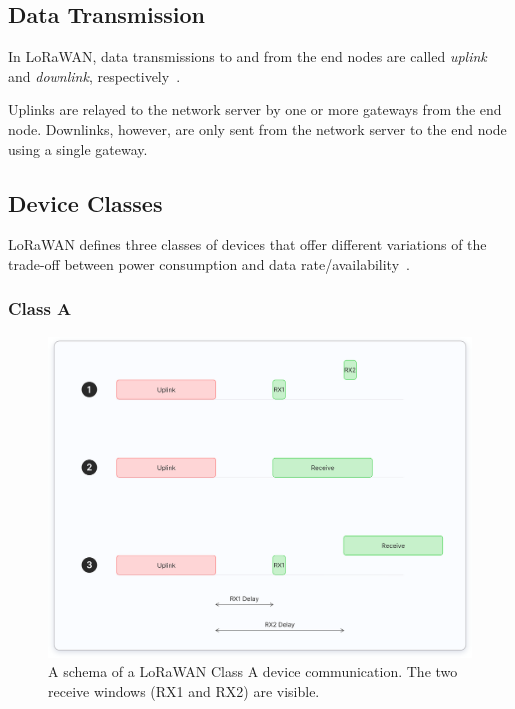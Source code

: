 \subsection{Data Transmission}

In LoRaWAN, data transmissions to and from the end nodes are called \emph{uplink} and \emph{downlink}, respectively~\cite[p. 12]{lora_alliance_inc_lorawan_2017}.

Uplinks are relayed to the network server by one or more gateways from the end node.
Downlinks, however, are only sent from the network server to the end node using a single gateway.
\subsection{Device Classes}

\ac{LoRaWAN} defines three classes of devices that offer different variations of the trade-off between power consumption and data rate/availability~\cite[p. 10]{lora_alliance_inc_lorawan_2017}.

\subsubsection{Class A}

\begin{figure}[htbp]
    \centering
    \includegraphics[width=1\textwidth]{pictures/device-classes/class-a.png}
    \caption{
        A schema of a \ac{LoRaWAN} Class A device communication.
        The two receive windows (RX1 and RX2) are visible.~\protect\cite{the_things_industries_bv_device_nodate}
    }\label{pic:lorawan-device-class-a-schema}
\end{figure}

